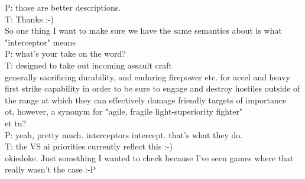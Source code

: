 P: those are better descriptions.\\
T: Thanks :-)\\
So one thing I want to make sure we have the same semantics about is what "interceptor" means\\
P: what's your take on the word?\\
T: designed to take out incoming assault craft\\
generally sacrificing durability, and enduring firepower etc. for accel and heavy first strike capability in order to be sure to engage and destroy hostiles outside of the range at which they can effectively damage friendly targets of importance\\
ot, however, a synonym for "agile, fragile light-superiority fighter"\\
et tu?\\
P: yeah, pretty much. interceptors intercept. that's what they do.\\
T: the VS ai priorities currently reflect this :-)\\
okiedoke. Just something I wanted to check because I've seen games where that really wasn't the case :-P\\

